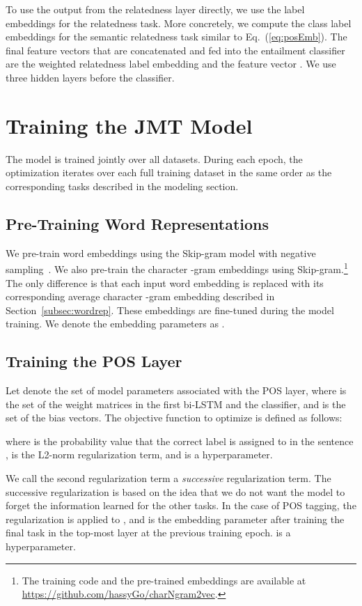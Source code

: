 \documentclass[11pt,a4paper]{article}
\begin{document}
To use the output from the relatedness layer directly, we use the label embeddings for the relatedness task.
More concretely, we compute the class label embeddings for the semantic relatedness task similar to Eq.~(\ref{eq:posEmb}).
The final feature vectors that are concatenated and fed into the entailment classifier are the weighted relatedness label embedding and the feature vector .
We use three  hidden layers before the classifier.



\section{Training the JMT Model}
\label{sec:training}
The model is trained jointly over all datasets.
During each epoch, the optimization iterates over each full training dataset in the same order as the corresponding tasks described in the modeling section.

\subsection{Pre-Training Word Representations}
\label{sec:trainingCharVecs}
We pre-train word embeddings using the Skip-gram model with negative sampling~\citep{mikolov2013word2vec}.
We also pre-train the character -gram embeddings using Skip-gram.\footnote{The training code and the pre-trained embeddings are available at \url{https://github.com/hassyGo/charNgram2vec}.}
The only difference is that each input word embedding is replaced with its corresponding average character -gram embedding described in Section~\ref{subsec:wordrep}.
These embeddings are fine-tuned during the model training.
We denote the embedding parameters as .

\subsection{Training the POS Layer}
\label{subsec:trainingPOS}
Let  denote the set of model parameters associated with the POS layer, where  is the set of the weight matrices in the first bi-LSTM and the classifier, and  is the set of the bias vectors.
The objective function to optimize  is defined as follows:

where  is the probability value that the correct label  is assigned to  in the sentence ,  is the L2-norm regularization term, and  is a hyperparameter.

We call the second regularization term  a {\it successive} regularization term.
The successive regularization is based on the idea that we do not want the model to forget the information learned for the other tasks.
In the case of POS tagging, the regularization is applied to , and  is the embedding parameter after training the final task in the top-most layer at the previous training epoch.
 is a hyperparameter.
\end{document}
